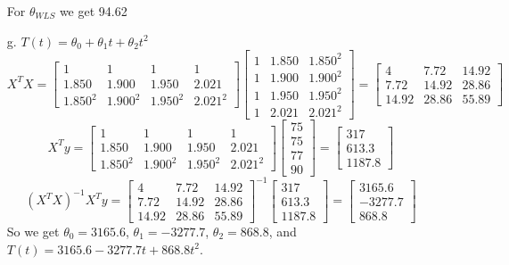 \documentclass[12pt]{article}
\begin{document}
\begin{enumerate}
	For $\theta_{WLS}$ we get 94.62
	\item[g.] $T(t) = \theta_{0} + \theta_{1}t + \theta_{2}t^{2}$
	\[
	X^{T}X = \begin{bmatrix}
	1 & 1 & 1 & 1 \\
	1.850 & 1.900 & 1.950 & 2.021 \\
	1.850^{2} & 1.900^{2} & 1.950^{2} & 2.021^{2}
	\end{bmatrix}
	\begin{bmatrix}
	1 & 1.850 & 1.850^{2}\\
	1 & 1.900 & 1.900^{2}\\
	1 & 1.950 & 1.950^{2}\\
	1 & 2.021 & 2.021^{2}
	\end{bmatrix} =
	\begin{bmatrix}
	4 & 7.72 & 14.92 \\
	7.72 & 14.92 & 28.86 \\
	14.92 & 28.86 & 55.89  
	\end{bmatrix}
	\]
	\[
	X^{T}y = \begin{bmatrix}
	1 & 1 & 1 & 1 \\
	1.850 & 1.900 & 1.950 & 2.021 \\
	1.850^{2} & 1.900^{2} & 1.950^{2} & 2.021^{2}
	\end{bmatrix}
	\begin{bmatrix}
	75 \\ 75 \\ 77 \\ 90
	\end{bmatrix} =
	\begin{bmatrix}
	317 \\ 613.3 \\ 1187.8
	\end{bmatrix}
	\]
	\[
	(X^{T}X)^{-1}X^{T}y = \begin{bmatrix}
	4 & 7.72 & 14.92 \\
	7.72 & 14.92 & 28.86 \\
	14.92 & 28.86 & 55.89  
	\end{bmatrix}^{-1}
	\begin{bmatrix}
	317 \\ 613.3 \\ 1187.8
	\end{bmatrix} = 
	\begin{bmatrix}
	3165.6 \\ -3277.7 \\ 868.8
	\end{bmatrix}
	\]
	So we get $\theta_{0} = 3165.6$, $\theta_{1} = -3277.7$, $\theta_{2} = 868.8$, and $T(t) = 3165.6 - 3277.7t + 868.8t^{2}$.
	

\end{enumerate}
\end{document}
